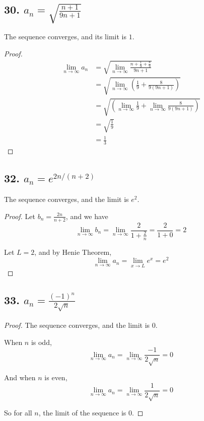 \documentclass{article}
\begin{document}
    \subsection*{30. $a_n = \sqrt{\frac{n+1}{9n+1}}$}
    The sequence converges, and its limit is $1$.
    \begin{proof}
        $$
        \begin{aligned}
            \lim_{n \to \infty}{a_n} &= \sqrt{\lim_{n \to \infty}\frac{n+\frac{1}{9} + \frac{8}{9}}{9n+1}} \\
            &= \sqrt{\lim_{n \to \infty} (\frac{1}{9} + \frac{8}{9(9n+1)})} \\
            &= \sqrt{ (\lim_{n \to \infty}\frac{1}{9} + \lim_{n \to \infty}\frac{8}{9(9n+1)})} \\
            &= \sqrt{\frac{1}{9}}  \\
            &= \frac{1}{3}
        \end{aligned}
        $$
    \end{proof}

    \subsection*{32. $a_n = e^{2n / (n + 2)}$}
    The sequence converges, and the limit is $e^2$.
    \begin{proof}
        Let $b_n = \frac{2n}{n + 2}$, and we have $$\lim_{n \to \infty}b_n = \lim_{n \to \infty}\frac{2}{1 + \frac{2}{n}} = \frac{2}{1 + 0} = 2$$

        Let $L = 2$, and by Henie Theorem, $$\lim_{n \to \infty}{a_n} = \lim_{x \to L}{e^x} = e^2$$
        
    \end{proof}

    \subsection*{33. $a_n = \frac{(-1)^n}{2\sqrt{n}}$}

    \begin{proof}
        The sequence converges, and the limit is $0$.


        When $n$ is odd, $$\lim_{n\to \infty}a_n = \lim_{n \to \infty}\frac{-1}{2\sqrt{n}} = 0$$

        And when $n$ is even, $$\lim_{n\to \infty}a_n = \lim_{n \to \infty}\frac{1}{2\sqrt{n}} = 0$$

        So for all $n$, the limit of the sequence is $0$.
    \end{proof}
\end{document}
